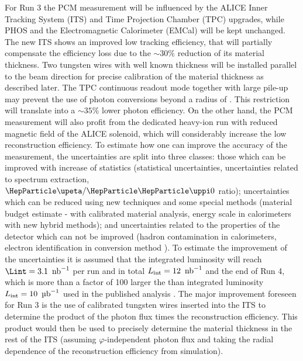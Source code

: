 For Run 3 the PCM measurement will be influenced by the ALICE Inner Tracking System (ITS) and Time Projection Chamber (TPC) upgrades, while PHOS and the Electromagnetic Calorimeter (EMCal) will be kept unchanged. 
The new ITS shows an improved low \pT{} tracking efficiency, that will partially compensate the efficiency loss due to the $\sim30\%$ reduction of its material thickness. Two \unit[1]{\Umm} tungsten wires with well known thickness will be installed parallel to the beam direction for precise calibration of the material thickness as described later. 
The TPC continuous readout mode together with large pile-up may prevent the use of photon conversions beyond a radius of \unit[35]{\Ucm}. This restriction will translate into a $\sim35\%$ lower photon efficiency. On the other hand, the PCM measurement will also profit from the dedicated heavy-ion run with reduced magnetic field of the ALICE solenoid, which will considerably increase the low \pT{} reconstruction efficiency.
To estimate how one can improve the accuracy of the measurement, the uncertainties are split into three classes: those which can be improved with increase of statistics (statistical uncertainties, uncertainties related to \PGpz spectrum extraction, $\PGh/\PGpz$ ratio); uncertainties which can be reduced using new techniques and some special methods (material budget estimate - with calibrated material analysis, energy scale in calorimeters with new hybrid \PGpz methods); and uncertainties related to the properties of the detector which can not be improved (hadron contamination in calorimeters, electron identification in conversion method \etc). 
To estimate the improvement of the uncertainties it is assumed that the integrated luminosity will reach $\Lint=\unit[3.1]{\Unb^{-1}}$ per \PbPb run and in total $L_{\rm int}=\unit[12]{\Unb^{-1}}$ and the end of Run 4, which is more than a factor of 100 larger the than integrated luminosity $L_{\rm int}=\unit[10]{\Uub^{-1}}$ used in the published analysis \cite{Adam:2015lda}. %
The major improvement foreseen for Run 3 is the use of calibrated tungsten wires
inserted into the ITS to determine the product of the photon flux times the \PGg reconstruction efficiency. This product would then be used to precisely determine the material thickness in the rest of the ITS (assuming $\varphi$-independent photon flux and taking the radial dependence of the reconstruction efficiency from simulation).
